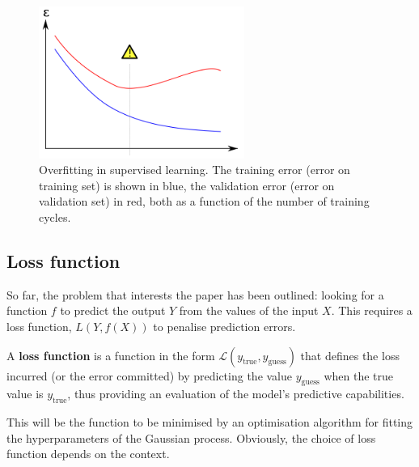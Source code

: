 \begin{figure}[htbp]
    \centering
    \includegraphics[width=0.6\textwidth]{images/Machine learning/Overfitting error.png}
    \caption{Overfitting in supervised learning. The training error (error on training set) is shown in blue, the validation error (error on validation set) in red, both as a function of the number of training cycles. \cite{wiki:overfitting}}
    \label{overfittingError}
\end{figure}


\subsection{Loss function}
So far, the problem that interests the paper has been outlined: looking for a function $f$ to predict the output $Y$ from the values of the input $X$. This requires a loss function, $L(Y, f (X))$ to penalise prediction errors.

\begin{defi}
    A \textbf{loss function} is a function in the form $\mathcal{L}(y_{\text{true}},y_{ \text{guess}})$ that defines the loss incurred (or the error committed) by predicting the value $y_{\text{guess}}$ when the true value is $y_{\text{true}}$, thus providing an evaluation of the model's predictive capabilities.
\end{defi}

This will be the function to be minimised by an optimisation algorithm for fitting the hyperparameters of the Gaussian process. Obviously, the choice of loss function depends on the context.




